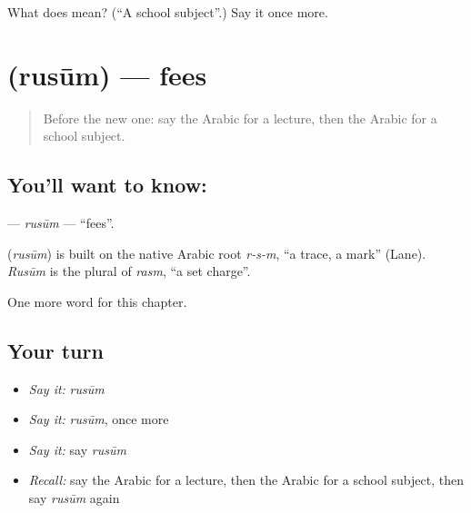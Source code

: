 \begin{tcolorbox}[breakable,colback=teal!4,colframe=teal!35!black,title={Before you move on}]
What does  mean? (\textquotedblleft{}A school subject\textquotedblright{}.) Say it once more.
\end{tcolorbox}
\section[\texorpdfstring{\ar{رسوم} (rusūm)}{رسوم (rusūm)}]{ (rusūm) — fees}

\label{lesson:AR-C252-rusum}



\begin{quote}
Before the new one: say the Arabic for a lecture, then the Arabic for a school subject.
\end{quote}

\subsection*{You'll want to know: }
\textbf{} — \emph{rusūm} — \textquotedblleft{}fees\textquotedblright{}.

\begin{cousinweb}
\textbf{} (\emph{rusūm}) is built on the native Arabic root \emph{r-s-m}, \textquotedblleft{}a trace, a mark\textquotedblright{} (Lane). \emph{Rusūm} is the plural of \emph{rasm}, \textquotedblleft{}a set charge\textquotedblright{}.
\end{cousinweb}

\begin{grammarlens}[title={What you've built}]
One more word for this chapter.
\end{grammarlens}

\subsection*{Your turn}
\begin{itemize}
\raggedright
  \item \emph{Say it:} \emph{rusūm}
  \item \emph{Say it:} \emph{rusūm}, once more
  \item \emph{Say it:} say \emph{rusūm}
  \item \emph{Recall:} say the Arabic for a lecture, then the Arabic for a school subject, then say \emph{rusūm} again
\end{itemize}

